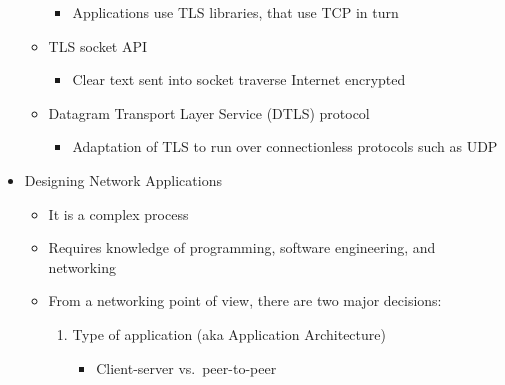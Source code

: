 \begin{itemize}
\begin{itemize}
        \begin{itemize}

          \item Applications use TLS libraries, that use TCP in turn

        \end{itemize}

      \item TLS socket API

        \begin{itemize}

          \item Clear text sent into socket traverse Internet encrypted

        \end{itemize}

      \item Datagram Transport Layer Service (DTLS) protocol

        \begin{itemize}

          \item Adaptation of TLS to run over connectionless protocols such as UDP

        \end{itemize}

    \end{itemize}

  \item Designing Network Applications

    \begin{itemize}

      \item It is a complex process

      \item Requires knowledge of programming, software engineering, and networking

      \item From a networking point of view, there are two major decisions:

        \begin{enumerate}

          \item Type of application (aka Application Architecture)

            \begin{itemize}

              \item Client-server vs.\ peer-to-peer

            \end{itemize}


\end{enumerate}
\end{itemize}
\end{itemize}
